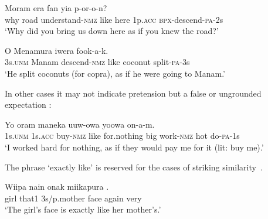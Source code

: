 \ea%
\label{ex:6:x1343}
\gll Moram  era      fan  yia p-or-o-n?\\
why  road  understand-\textsc{nmz}  like  here  1p.\textsc{acc} \textsc{bpx}-descend-\textsc{pa}-2s\\
\glt `Why did you bring us down here as if you knew the road?'
\z

\ea%
\label{ex:6:x1344}
\gll O  Menamura      iwera  fook-a-k. \\
3s.\textsc{unm}  Manam  descend-\textsc{nmz}  like  coconut  split-\textsc{pa}-3s\\
\glt `He split coconuts (for copra), as if he were going to Manam.'
\z

In other cases it may not indicate pretension but a false or ungrounded expectation : 

\ea%
\label{ex:6:x1345}
\gll Yo        oram  maneka uuw-owa  yoowa  on-a-m. \\
1s.\textsc{unm}  1s.\textsc{acc}  buy-\textsc{nmz}  like  for.nothing  big work-\textsc{nmz}  hot  do-\textsc{pa}-1s\\
\glt `I worked hard for nothing, as if they would pay me for it (lit: buy me).'
\z

The phrase  `exactly like' is reserved for the cases of striking similarity~. 

\ea%
\label{ex:6:x1346}
\gll Wiipa  nain  onak  miikapura    . \\
girl  that1  3s/p.mother  face  again  very\\
\glt `The girl's face is exactly like her mother's.'
\z